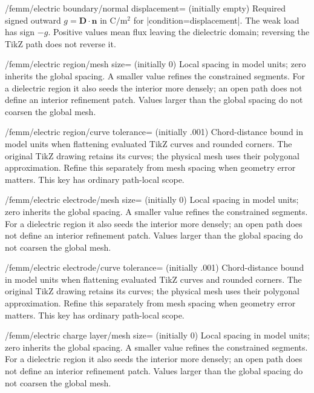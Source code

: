 \begin{key}{/femm/electric boundary/normal displacement= (initially \normalfont empty)}
Required signed outward $g=\mathbf D\cdot\mathbf n$ in $\mathrm{C/m^2}$ for
|condition=displacement|. The weak load has sign $-g$. Positive values mean
flux leaving the dielectric domain; reversing the TikZ path does not reverse it.
\end{key}
\begin{key}{/femm/electric region/mesh size= (initially 0)}
Local spacing in model units; zero inherits the global spacing. A smaller
value refines the constrained segments. For a dielectric region it also seeds
the interior more densely; an open path does not define an interior refinement
patch. Values larger than the global spacing do not coarsen the global mesh.
\end{key}
\begin{key}{/femm/electric region/curve tolerance= (initially .001)}
Chord-distance bound in model units when flattening evaluated TikZ curves and
rounded corners. The original TikZ drawing retains its curves; the physical
mesh uses their polygonal approximation. Refine this separately from mesh
spacing when geometry error matters. This key has ordinary path-local scope.
\end{key}
\begin{key}{/femm/electric electrode/mesh size= (initially 0)}
Local spacing in model units; zero inherits the global spacing. A smaller
value refines the constrained segments. For a dielectric region it also seeds
the interior more densely; an open path does not define an interior refinement
patch. Values larger than the global spacing do not coarsen the global mesh.
\end{key}
\begin{key}{/femm/electric electrode/curve tolerance= (initially .001)}
Chord-distance bound in model units when flattening evaluated TikZ curves and
rounded corners. The original TikZ drawing retains its curves; the physical
mesh uses their polygonal approximation. Refine this separately from mesh
spacing when geometry error matters. This key has ordinary path-local scope.
\end{key}
\begin{key}{/femm/electric charge layer/mesh size= (initially 0)}
Local spacing in model units; zero inherits the global spacing. A smaller
value refines the constrained segments. For a dielectric region it also seeds
the interior more densely; an open path does not define an interior refinement
patch. Values larger than the global spacing do not coarsen the global mesh.
\end{key}

